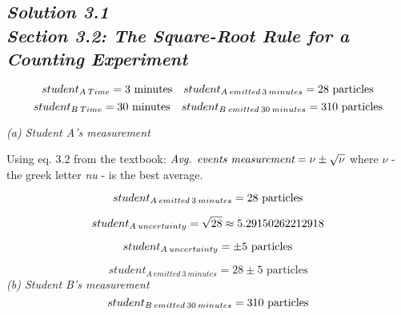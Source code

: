 \documentclass[a4paper, 12pt]{article}
\numberwithin{equation}{section}
\begin{document}
\subsection*{\emph{Solution 3.1\\Section 3.2: The Square-Root Rule for a Counting Experiment}}

  \begin{equation}
    student_{A\:Time}= 3 \text{ minutes} \quad student_{A\:emitted\:3\:minutes} = 28 \text{ particles}\\
  \end{equation}
  \begin{equation}
    student_{B\:Time}= 30 \text{ minutes} \quad student_{B\:emitted\:30\:minutes} =  310 \text{ particles}\\
  \end{equation}


\begin{flushleft}
  \emph{(a) Student A's measurement}

  Using eq. 3.2 from the textbook:
  $\emph{Avg. events measurement} = \nu \pm{\sqrt{\nu}}$
  where
  $\nu$
  - the greek letter \emph{nu} - is the best average.
\end{flushleft}


\begin{equation}
  student_{A\:emitted\:3\:minutes} =  28 \text{ particles}\\
\end{equation}

\begin{equation}
  student_{A\:uncertainty} = \sqrt{28} \approx{5.29150262212918}   \\
\end{equation}

\begin{equation}
  student_{A\:uncertainty} = \pm{5 \text{ particles}} \\
\end{equation}

\begin{equation}
  \boxed { student_{A\:emitted\:3\:minutes} =  28 \pm{5 \text{ particles}} }
\end{equation}
\emph{(b) Student B's measurement}
\begin{equation}
  student_{B\:emitted\:30\:minutes} = 310 \text{ particles}\\
\end{equation}
\end{document}
